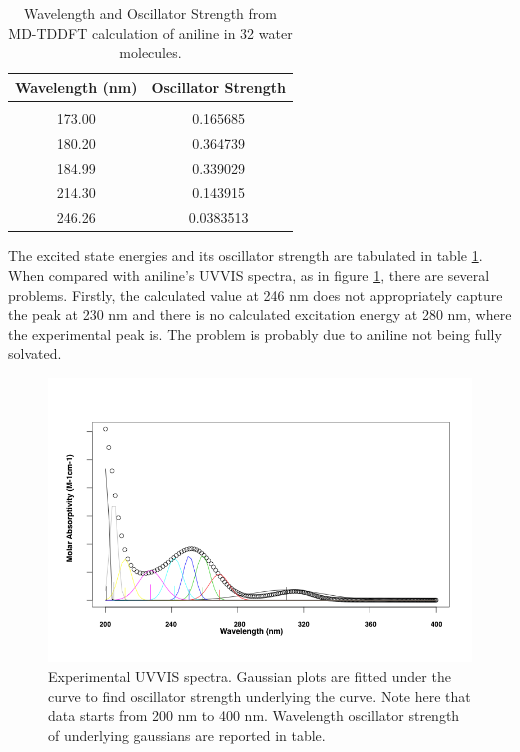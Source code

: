 \documentclass[
journal=jacsat, %
manuscript=article]{achemso}
\begin{document}

\begin{table}[ht]
	\caption{Wavelength and Oscillator Strength from MD-TDDFT calculation of aniline in 32 water molecules.}
	\label{table:aniline32TDDFTTable}
	\centering
	\begin{tabular}{c c}
		Wavelength (nm) & Oscillator Strength\\ [1ex] %
		\hline\hline
		\\[-0.5ex]
		173.00&0.165685\\
		180.20&0.364739 \\
		184.99&0.339029\\
		214.30&0.143915\\
		246.26&0.0383513\\ [1ex]
	\end{tabular}
\end{table}

The excited state energies and its oscillator strength are tabulated in table \ref{table:aniline32TDDFTTable}. When compared with aniline's UVVIS spectra, as in figure \ref{fig:UVFromR}, there are several problems. Firstly, the calculated value at 246 nm does not appropriately capture  the peak at 230 nm and there is no calculated excitation energy at 280 nm, where the experimental peak is. The problem is probably due to aniline not being fully solvated. 



\begin{figure}[htb]
	\centering		
	\includegraphics[width=1\textwidth]{UVVISFromR.png}
	\caption{Experimental UVVIS spectra. Gaussian plots are fitted under the curve to find oscillator strength underlying the curve. Note here that data starts from 200 nm to 400 nm. Wavelength oscillator strength of underlying gaussians are reported in table.}
	\label{fig:UVFromR}
\end{figure}
\end{document}
